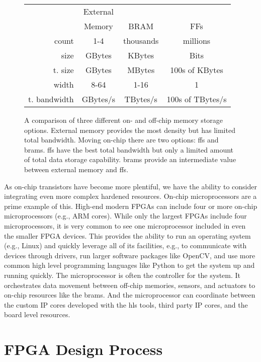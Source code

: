 \begin{figure}
\centering
\begin{footnotesize}
\begin{tabular}{|r|c|c|c|}
\hline
 & External &  & \\
  & Memory & BRAM & FFs \\
\hline
count & 1-4 & thousands & millions \\
size & GBytes & KBytes & Bits \\
t. size & GBytes & MBytes & 100s of KBytes \\
width & 8-64 & 1-16 & 1 \\
t. bandwidth & GBytes/s & TBytes/s & 100s of TBytes/s \\
\hline
\end{tabular}
\end{footnotesize}
\caption{A comparison of three different on- and off-chip memory storage options. External memory provides the most density but has limited total bandwidth. Moving on-chip there are two options: \glspl{ff} and \glspl{bram}. \glspl{ff} have the best total bandwidth but only a limited amount of total data storage capability. \glspl{bram} provide an intermediate value between external memory and \glspl{ff}.}
\label{fig:FPGAmemories}
\end{figure}

As on-chip transistors have become more plentiful, we have the ability to consider integrating even more complex hardened resources. On-chip microprocessors are a prime example of this. High-end modern FPGAs can include four or more on-chip microprocessors (e.g., ARM cores). While only the largest FPGAs include four microprocessors, it is very common to see one microprocessor included in even the smaller FPGA devices. This provides the ability to run an operating system (e.g., Linux) and quickly leverage all of its facilities, e.g., to communicate with devices through drivers, run larger software packages like OpenCV, and use more common high level programming languages like Python to get the system up and running quickly. The microprocessor is often the controller for the system. It orchestrates data movement between off-chip memories, sensors, and actuators  to on-chip resources like the \glspl{bram}. And the microprocessor can coordinate between the custom IP cores developed with the \gls{hls} tools, third party IP cores, and the board level resources.   

\section{FPGA Design Process}

